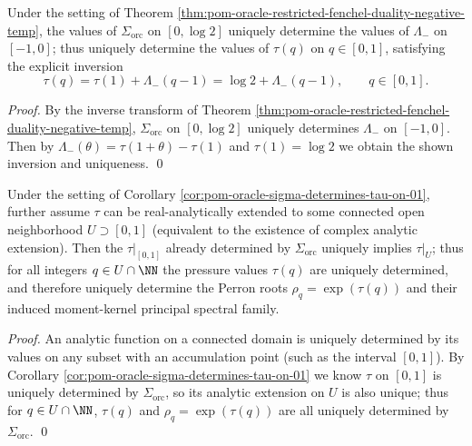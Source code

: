\begin{corollary}\label{cor:pom-oracle-sigma-determines-tau-on-01}
Under the setting of Theorem \ref{thm:pom-oracle-restricted-fenchel-duality-negative-temp}, the values of \(\Sigma_{\mathrm{orc}}\) on \([0,\log 2]\) uniquely determine the values of \(\Lambda_{-}\) on \([-1,0]\);
thus uniquely determine the values of \(\tau(q)\) on \(q\in[0,1]\), satisfying the explicit inversion
\[
\boxed{\;
\tau(q)=\tau(1)+\Lambda_{-}(q-1)=\log 2+\Lambda_{-}(q-1),\qquad q\in[0,1].\;}
\]
\end{corollary}
\begin{proof}
By the inverse transform of Theorem \ref{thm:pom-oracle-restricted-fenchel-duality-negative-temp}, \(\Sigma_{\mathrm{orc}}\) on \([0,\log 2]\) uniquely determines \(\Lambda_{-}\) on \([-1,0]\).
Then by \(\Lambda_{-}(\theta)=\tau(1+\theta)-\tau(1)\) and \(\tau(1)=\log 2\) we obtain the shown inversion and uniqueness. \qed
\end{proof}

\begin{corollary}\label{cor:pom-oracle-analytic-extension-all-spectrum}
Under the setting of Corollary \ref{cor:pom-oracle-sigma-determines-tau-on-01}, further assume \(\tau\) can be real-analytically extended to some connected open neighborhood \(U\supset[0,1]\) (equivalent to the existence of complex analytic extension).
Then the \(\tau|_{[0,1]}\) already determined by \(\Sigma_{\mathrm{orc}}\) uniquely implies \(\tau|_{U}\);
thus for all integers \(q\in U\cap\NN\) the pressure values \(\tau(q)\) are uniquely determined, and therefore uniquely determine the Perron roots \(\rho_q=\exp(\tau(q))\) and their induced moment-kernel principal spectral family.
\end{corollary}
\begin{proof}
An analytic function on a connected domain is uniquely determined by its values on any subset with an accumulation point (such as the interval \([0,1]\)).
By Corollary \ref{cor:pom-oracle-sigma-determines-tau-on-01} we know \(\tau\) on \([0,1]\) is uniquely determined by \(\Sigma_{\mathrm{orc}}\), so its analytic extension on \(U\) is also unique;
thus for \(q\in U\cap\NN\), \(\tau(q)\) and \(\rho_q=\exp(\tau(q))\) are all uniquely determined by \(\Sigma_{\mathrm{orc}}\). \qed
\end{proof}

